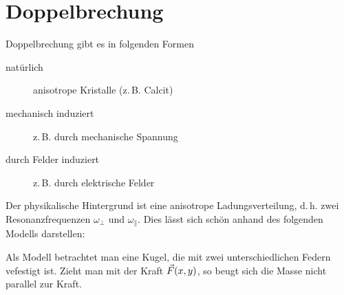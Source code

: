 
\section{Doppelbrechung} 
Doppelbrechung gibt es in folgenden Formen
\begin{description}
\item[natürlich] anisotrope Kristalle (z.\,B. Calcit)
\item[mechanisch induziert] z.\,B. durch mechanische Spannung
\item[durch Felder induziert] z.\,B. durch elektrische Felder
\end{description}
Der physikalische Hintergrund ist eine anisotrope Ladungsverteilung,
d.\,h. zwei Resonanzfrequenzen $\omega_\bot$ und $\omega_\parallel$.
Dies lässt sich schön anhand des folgenden Modells darstellen:

Als Modell betrachtet man eine Kugel, die mit zwei unterschiedlichen
Federn vefestigt ist.
Zieht man mit der Kraft $\vec{F}(x,y)$, so beugt sich die Masse nicht
parallel zur Kraft.

